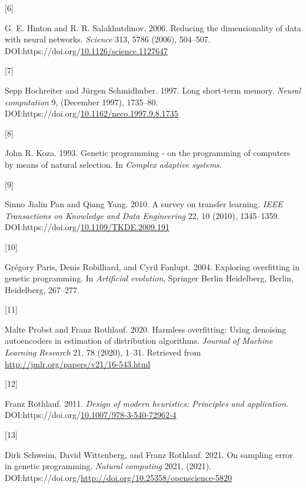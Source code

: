 \documentclass[
  11pt,
]{article}
\newlength{\cslhangindent}
\newlength{\csllabelwidth}
\newlength{\cslentryspacingunit} %
\newenvironment{CSLReferences}[2] %
 {%
  \setlength{\parindent}{0pt}
  \ifodd #1
  \let\oldpar\par
  \def\par{\hangindent=\cslhangindent\oldpar}
  \fi
  \setlength{\parskip}{#2\cslentryspacingunit}
 }%
 {}
\newcommand{\CSLLeftMargin}[1]{\parbox[t]{\csllabelwidth}{#1}}
\newcommand{\CSLRightInline}[1]{\parbox[t]{\linewidth - \csllabelwidth}{#1}\break}
\begin{document}
\begin{CSLReferences}{0}{0}
\leavevmode{}%
\CSLLeftMargin{{[}6{]} }%
\CSLRightInline{G. E. Hinton and R. R. Salakhutdinov. 2006. Reducing the
dimensionality of data with neural networks. \emph{Science} 313, 5786
(2006), 504--507.
DOI:https://doi.org/\href{https://doi.org/10.1126/science.1127647}{10.1126/science.1127647}}

\leavevmode{}%
\CSLLeftMargin{{[}7{]} }%
\CSLRightInline{Sepp Hochreiter and Jürgen Schmidhuber. 1997. Long
short-term memory. \emph{Neural computation} 9, (December 1997),
1735--80.
DOI:https://doi.org/\href{https://doi.org/10.1162/neco.1997.9.8.1735}{10.1162/neco.1997.9.8.1735}}

\leavevmode{}%
\CSLLeftMargin{{[}8{]} }%
\CSLRightInline{John R. Koza. 1993. Genetic programming - on the
programming of computers by means of natural selection. In \emph{Complex
adaptive systems}.}

\leavevmode{}%
\CSLLeftMargin{{[}9{]} }%
\CSLRightInline{Sinno Jialin Pan and Qiang Yang. 2010. A survey on
transfer learning. \emph{IEEE Transactions on Knowledge and Data
Engineering} 22, 10 (2010), 1345--1359.
DOI:https://doi.org/\href{https://doi.org/10.1109/TKDE.2009.191}{10.1109/TKDE.2009.191}}

\leavevmode{}%
\CSLLeftMargin{{[}10{]} }%
\CSLRightInline{Grégory Paris, Denis Robilliard, and Cyril Fonlupt.
2004. Exploring overfitting in genetic programming. In \emph{Artificial
evolution}, Springer Berlin Heidelberg, Berlin, Heidelberg, 267--277.}

\leavevmode{}%
\CSLLeftMargin{{[}11{]} }%
\CSLRightInline{Malte Probst and Franz Rothlauf. 2020. Harmless
overfitting: Using denoising autoencoders in estimation of distribution
algorithms. \emph{Journal of Machine Learning Research} 21, 78 (2020),
1--31. Retrieved from \url{http://jmlr.org/papers/v21/16-543.html}}

\leavevmode{}%
\CSLLeftMargin{{[}12{]} }%
\CSLRightInline{Franz Rothlauf. 2011. \emph{Design of modern heuristics:
Principles and application}.
DOI:https://doi.org/\href{https://doi.org/10.1007/978-3-540-72962-4}{10.1007/978-3-540-72962-4}}

\leavevmode{}%
\CSLLeftMargin{{[}13{]} }%
\CSLRightInline{Dirk Schweim, David Wittenberg, and Franz Rothlauf.
2021. On sampling error in genetic programming. \emph{Natural computing}
2021, (2021).
DOI:https://doi.org/\url{http://doi.org/10.25358/openscience-5820}}


\end{CSLReferences}
\end{document}
